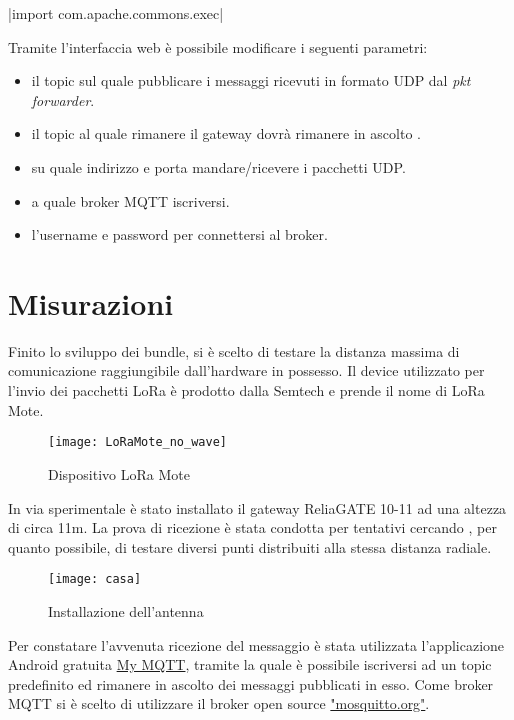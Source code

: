 |import com.apache.commons.exec|

Tramite l'interfaccia web è possibile modificare i seguenti parametri:
\begin{itemize}
\item il topic sul quale pubblicare i messaggi ricevuti in formato UDP dal
\emph{pkt forwarder}.
\item il topic al quale rimanere il gateway dovrà rimanere in ascolto .
\item su quale indirizzo e porta mandare/ricevere i pacchetti UDP.
\item a quale broker MQTT iscriversi.
\item l'username e password per connettersi al broker.
\end{itemize}


\section{Misurazioni}
Finito lo sviluppo dei bundle, si è scelto di testare la distanza massima
di comunicazione raggiungibile dall'hardware in possesso. 
Il device utilizzato per l'invio dei pacchetti LoRa è prodotto dalla Semtech e
prende il nome di LoRa Mote.
\begin{figure}[th]
        \centering 
                \texttt{[image: LoRaMote\_no\_wave]}
        \caption{Dispositivo LoRa Mote}
        \label{fig:Software_stack}
\end{figure}
In via sperimentale è stato installato  il gateway
ReliaGATE 10-11 ad una altezza di circa 11m. La prova di ricezione è stata condotta per
tentativi cercando , per quanto possibile, di testare diversi punti distribuiti
alla stessa distanza radiale. 
\begin{figure}[th]
        \centering 
                \texttt{[image: casa]}
        \caption{Installazione dell'antenna}
        \label{fig:Software_stack}
\end{figure}
Per constatare l'avvenuta ricezione del
messaggio è stata utilizzata l'applicazione Android gratuita \href{
https://play.google.com/store/apps/details?id=at.tripwire.mqtt.client&hl=en}{My
MQTT}, tramite la
quale è possibile iscriversi ad un topic predefinito ed rimanere in ascolto dei
messaggi pubblicati in esso. 
Come broker MQTT si è scelto di utilizzare il
broker open source \href{http://mosquitto.org/}{"mosquitto.org"}. 
